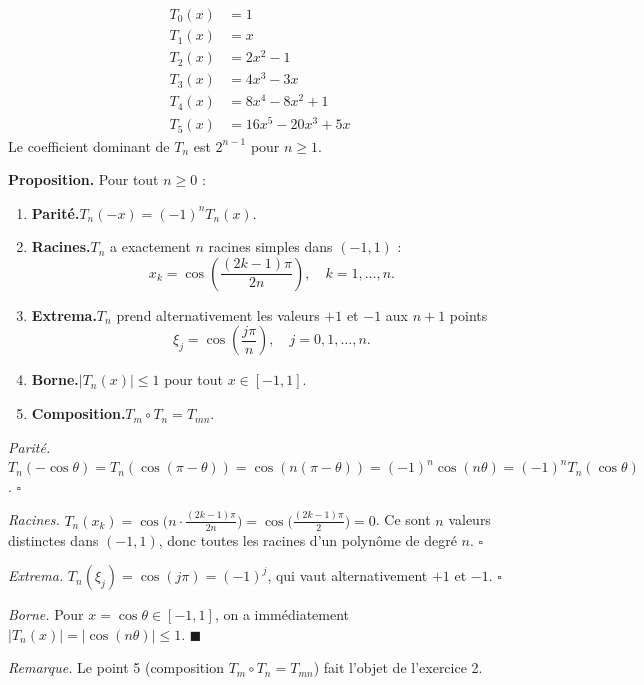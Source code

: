 \begin{mdframed}[style=exbar]
  \begin{align*}
    T_0(x) &= 1 \\
    T_1(x) &= x \\
    T_2(x) &= 2x^2 - 1 \\
    T_3(x) &= 4x^3 - 3x \\
    T_4(x) &= 8x^4 - 8x^2 + 1 \\
    T_5(x) &= 16x^5 - 20x^3 + 5x
  \end{align*}
  Le coefficient dominant de $T_n$ est $2^{n-1}$ pour $n \geq 1$.
\end{mdframed}

\decsep{}


\begin{tcolorbox}[thmbox]
  \textbf{Proposition.}\enspace
  Pour tout $n \geq 0$ :
  \begin{enumerate}
    \item \textbf{Parité.}\enspace $T_n(-x) = {(-1)}^n T_n(x)$.
    \item \textbf{Racines.}\enspace $T_n$ a exactement $n$ racines simples
          dans $(-1,1)$ :
          \[
            x_k = \cos\!\left(\frac{(2k-1)\pi}{2n}\right),
            \quad k = 1, \ldots, n.
          \]
    \item \textbf{Extrema.}\enspace $T_n$ prend alternativement les valeurs
          $+1$ et $-1$ aux $n+1$ points
          \[
            \xi_j = \cos\!\left(\frac{j\pi}{n}\right),
            \quad j = 0, 1, \ldots, n.
          \]
    \item \textbf{Borne.}\enspace $|T_n(x)| \leq 1$ pour tout $x \in [-1,1]$.
    \item \textbf{Composition.}\enspace $T_m \circ T_n = T_{mn}$.
  \end{enumerate}
\end{tcolorbox}


\begin{mdframed}[style=proofbar]
  \textit{Parité.} $T_n(-\cos\theta)=T_n(\cos(\pi-\theta))=\cos(n(\pi-\theta))
  ={(-1)}^n\cos(n\theta)={(-1)}^n T_n(\cos\theta)$. \hfill$\square$

  \smallskip
  \textit{Racines.} $T_n(x_k)=\cos\!\bigl(n\cdot\tfrac{(2k-1)\pi}{2n}\bigr)
  =\cos\!\bigl(\tfrac{(2k-1)\pi}{2}\bigr)=0$.
  Ce sont $n$ valeurs distinctes dans $(-1,1)$, donc toutes les racines
  d'un polynôme de degré $n$. \hfill$\square$

  \smallskip
  \textit{Extrema.} $T_n(\xi_j)=\cos(j\pi)={(-1)}^j$, qui vaut
  alternativement $+1$ et $-1$. \hfill$\square$

  \smallskip
  \textit{Borne.} Pour $x=\cos\theta\in[-1,1]$, on a immédiatement
  $|T_n(x)|=|\cos(n\theta)|\leq 1$. \hfill$\blacksquare$

  \smallskip
  \emph{Remarque.} Le point 5 (composition $T_m\circ T_n=T_{mn}$) fait
  l'objet de l'exercice 2.
\end{mdframed}

